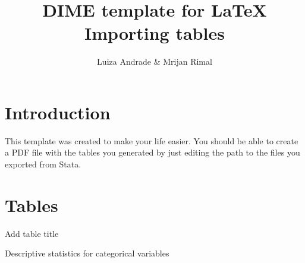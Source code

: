 \documentclass{article}                 %
\title{DIME template for \LaTeX \\ Importing tables} 	%
\author{Luiza Andrade \& Mrijan Rimal}
\begin{document}

    \maketitle
    \tableofcontents        %
    \listoftables			%

    \newpage    
    \section{Introduction} %
    
        This template was created to make your life easier. You should be able to create a PDF file with the tables you generated by just editing the path to the files you exported from Stata.
     
    \section{Tables}

   		
           	   
		\begin{table}[H]
			\caption{Add table title}
			
		\end{table}
	
		\begin{table}[H]
			\caption{Descriptive statistics for categorical variables}
			\begin{adjustbox}{max width=\textwidth}   
			\end{adjustbox}
		\end{table}
           
  
\end{document}
